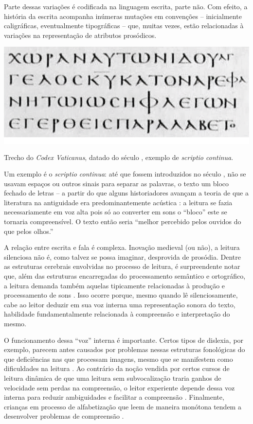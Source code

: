 \documentclass[a4paper]{tufte-handout}
\newcommand{\textls}[2][5]{%
    \begingroup\addfontfeatures{LetterSpace=#1}#2\endgroup
  }
\renewcommand{\smallcapsspacing}[1]{\textls[10]{#1}}
\renewcommand{\textsc}[1]{\smallcapsspacing{\textsmallcaps{#1}}}
\begin{document}
Parte dessas variações é codificada na linguagem escrita, parte não. Com efeito, a história da escrita acompanha inúmeras mutações em convenções -- inicialmente caligráficas, eventualmente tipográficas -- que, muitas vezes, estão relacionadas à variações na representação de atributos prosódicos. 

\begin{marginfigure}
  \includegraphics{imgs/codex.png}
  \caption{Trecho do \textit{Codex Vaticanus}, datado do século \textsc{iv}, exemplo de \textit{scriptio continua}. \citep{codex_vaticanus}}
  \label{cdx_vat}
\end{marginfigure}

Um exemplo é o \textit{scriptio continua}: até que fossem introduzidos no século \textsc{vii}, não se usavam espaços ou outros sinais para separar as palavras, o texto um bloco fechado de letras -- a partir do que alguns historiadores avançam a teoria de que a literatura na antiguidade era predominantemente acústica \citep{kuster2016}: a leitura se fazia necessariamente em voz alta pois só ao converter em sons o ``bloco'' este se tornaria compreensível. O texto então seria ``melhor percebido pelos ouvidos do que pelos olhos.'' \citep{nunlist1991}

A relação entre escrita e fala é complexa. Inovação medieval (ou não), a leitura silenciosa não é, como talvez se possa imaginar, desprovida de prosódia. Dentre as estruturas cerebrais envolvidas no processo de leitura, é surpreendente notar que, além das estruturas encarregadas do processamento semântico e ortográfico, a leitura demanda também aquelas tipicamente relacionadas à produção e processamento de sons \citep[cap.~7]{seidenberg2017}. Isso ocorre porque, mesmo quando lê silenciosamente, cabe ao leitor deduzir em sua voz interna uma representação sonora do texto, habilidade fundamentalmente relacionada à compreensão e interpretação do mesmo.

O funcionamento dessa ``voz'' interna é importante. Certos tipos de dislexia, por exemplo, parecem antes causados por problemas nessas estruturas fonológicas do que deficiências nas que processam imagens, mesmo que se manifestem como dificuldades na  leitura \citep[cap.~8]{seidenberg2017}. Ao contrário da noção vendida por certos cursos de leitura dinâmica de que uma leitura sem subvocalização traria ganhos de velocidade sem perdas na compreensão, o leitor experiente depende dessa voz interna para reduzir ambiguidades e facilitar a compreensão \citep[cap.~4]{seidenberg2017}. Finalmente, crianças em processo de alfabetização que leem de maneira monótona tendem a desenvolver problemas de compreensão \citep{bessemans2017}.
\end{document}
